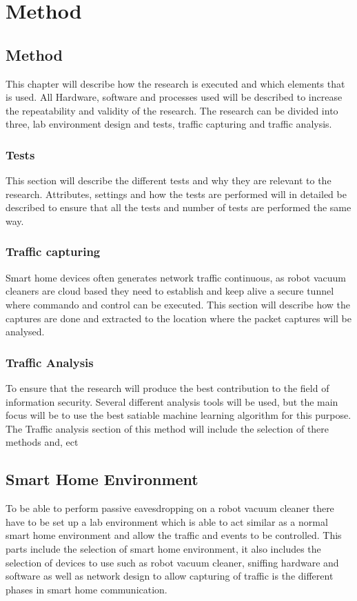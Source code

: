 \chapter*{Method}

\section{Method}
This chapter will describe how the research is executed and which elements that is used. All Hardware, software and processes used will be described to increase the repeatability and validity of the research. The research can be divided into three, lab environment design and tests, traffic capturing and traffic analysis.

\subsection{Tests}
This section will describe the different tests and why they are relevant to the research. Attributes, settings and how the tests are performed will in detailed be described to ensure that all the tests and number of tests are performed the same way.

\subsection{Traffic capturing}
Smart home devices often generates network traffic continuous, as robot vacuum cleaners are cloud based they need to establish and keep alive a secure tunnel where commando and control can be executed. This section will describe how the captures are done and extracted to the location where the packet captures will be analysed. 

\subsection{Traffic Analysis}
To ensure that the research will produce the best contribution to the field of information security. Several different analysis tools will be used, but the main focus will be to use the best satiable machine learning algorithm for this purpose. The Traffic analysis section of this method will include the selection of there methods and, ect    

\section{Smart Home Environment}
To be able to perform passive eavesdropping on a robot vacuum cleaner there have to be set up a lab environment which is able to act similar as a normal smart home environment and allow the traffic and events to be controlled. This parts include the selection of smart home environment, it also includes the selection of devices to use such as robot vacuum cleaner, sniffing hardware and software as well as network design to allow capturing of traffic is the different phases in smart home communication. 

